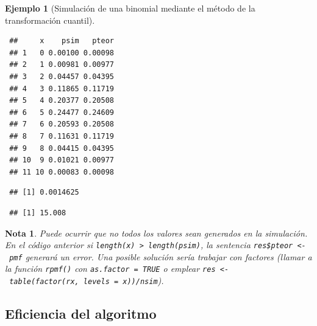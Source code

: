 \documentclass[
]{book}
\newenvironment{Shaded}{\begin{snugshade}}{\end{snugshade}}
\newcommand{\CommentTok}[1]{\textcolor[rgb]{0.56,0.35,0.01}{\textit{#1}}}
\newcommand{\DecValTok}[1]{\textcolor[rgb]{0.00,0.00,0.81}{#1}}
\newcommand{\FunctionTok}[1]{\textcolor[rgb]{0.00,0.00,0.00}{#1}}
\newcommand{\NormalTok}[1]{#1}
\newcommand{\SpecialCharTok}[1]{\textcolor[rgb]{0.00,0.00,0.00}{#1}}
\theoremstyle{break}
\newtheorem{example}{Ejemplo}[chapter]
\theoremstyle{nonumberplain}
\newtheorem{remark}{Nota}
\renewcommand{\CommentTok}[1]{\textcolor[rgb]{0.41,0.41,0.41}{\texttt{#1}}}
\begin{document}
\begin{example}[Simulación de una binomial mediante el método de la transformación cuantil]
\begin{verbatim}
 ##     x    psim   pteor
 ## 1   0 0.00100 0.00098
 ## 2   1 0.00981 0.00977
 ## 3   2 0.04457 0.04395
 ## 4   3 0.11865 0.11719
 ## 5   4 0.20377 0.20508
 ## 6   5 0.24477 0.24609
 ## 7   6 0.20593 0.20508
 ## 8   7 0.11631 0.11719
 ## 9   8 0.04415 0.04395
 ## 10  9 0.01021 0.00977
 ## 11 10 0.00083 0.00098
\end{verbatim}

\begin{Shaded}
\end{Shaded}

\begin{verbatim}
 ## [1] 0.0014625
\end{verbatim}

\begin{Shaded}
\end{Shaded}

\begin{verbatim}
 ## [1] 15.008
\end{verbatim}

\end{example}

\begin{remark}
Puede ocurrir que no todos los valores sean generados en la simulación.
En el código anterior si \texttt{length(x)\ \textgreater{}\ length(psim)}, la sentencia \texttt{res\$pteor\ \textless{}-\ pmf} generará un error.
Una posible solución sería trabajar con factores (llamar a la función \texttt{rpmf()} con \texttt{as.factor\ =\ TRUE} o emplear \texttt{res\ \textless{}-\ table(factor(rx,\ levels\ =\ x))/nsim}).
\end{remark}

\hypertarget{eficiencia-del-algoritmo-1}{%
\subsection{Eficiencia del algoritmo}\label{eficiencia-del-algoritmo-1}}
\end{document}
